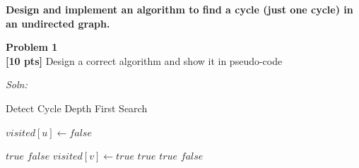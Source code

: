 \documentclass{article}
\newenvironment{problem}[2][Problem]
    { \begin{mdframed}[backgroundcolor=gray!20] \textbf{#1 #2} \\}
    {  \end{mdframed}}
\newenvironment{solution}
    {\textit{Soln:}}
    {}
\begin{document}
\begin{mdframed}[backgroundcolor=yellow!20]
\textbf{Design and implement an algorithm to find a cycle (just one cycle) in an undirected graph.} 
\end{mdframed}

\begin{problem}{1}
\textbf{[10 pts]} Design a correct algorithm and show it in pseudo-code 
\end{problem}
\begin{solution}
\begin{algorithm}
\caption{Detect Cycle Depth First Search}\label{dfs}
\begin{algorithmic}[1]
        \State \texttt{$visited[u] \gets false$}
    \EndFor
    
                \State \Return \texttt{$true$}
            \EndIf
        \EndIf
    \EndFor
    \State \Return $false$
\EndProcedure
\newline
{}
    \State \texttt{$visited[v] \gets true$}
                \State \Return \texttt{$true$}
            \EndIf
        \Else
             
                \State \Return $true$
            \EndIf
        \EndIf
    \EndFor
    \State \Return $false$
\EndProcedure
\end{algorithmic}
\end{algorithm}

\end{solution}
\end{document}
